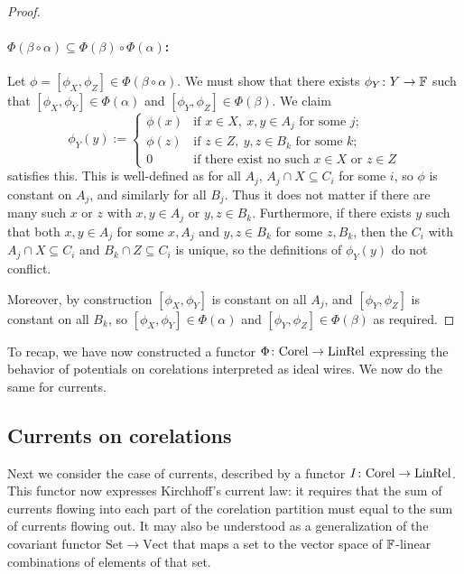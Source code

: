 \begin{proof}
  \paragraph{$\Phi(\beta\circ\alpha) \subseteq \Phi(\beta) \circ \Phi(\alpha)$:}
  Let $\phi = [\phi_X,\phi_Z] \in \Phi(\beta\circ\alpha)$. We must show that there
  exists $\phi_Y{\colon} Y \to {\mathbb F}$ such that $[\phi_X,\phi_Y] \in \Phi(\alpha)$ and
  $[\phi_Y,\phi_Z] \in \Phi(\beta)$. We claim
  \[
    \phi_Y(y):= \begin{cases}
      \phi(x) & \mbox{if } x \in X, \: x,y \in A_j \mbox{ for some }j;\\
      \phi(z) & \mbox{if } z \in Z, \: y,z \in B_k \mbox{ for some }k;\\
      0 & \mbox{if there exist no such }x \in X \mbox{ or }z \in Z
    \end{cases}
  \]
  satisfies this. This is well-defined as for all $A_j$, $A_j \cap X \subseteq
  C_i$ for some $i$, so $\phi$ is constant on $A_j$, and similarly for all $B_j$.
  Thus it does not matter if there are many such $x$ or $z$ with $x, y \in A_j$ or
  $y,z \in B_k$.  Furthermore, if there exists $y$ such that both $x,y \in A_j$
  for some $x,A_j$ and $y,z \in B_k$ for some $z,B_k$, then the $C_i$ with $A_j
  \cap X \subseteq C_i$ and $B_k \cap Z \subseteq C_i$ is unique, so the
  definitions of $\phi_Y(y)$ do not conflict.

  Moreover, by construction $[\phi_X,\phi_Y]$ is constant on all $A_j$, and
  $[\phi_Y,\phi_Z]$ is constant on all $B_k$, so $[\phi_X,\phi_Y] \in
  \Phi(\alpha)$ and $[\phi_Y,\phi_Z] \in \Phi(\beta)$ as required.
\end{proof}

To recap, we have now constructed a functor $\Phi{\colon} \mathrm{Corel} \to
\mathrm{LinRel}$ expressing the behavior of potentials on corelations interpreted
as ideal wires. We now do the same for currents.

\subsection{Currents on corelations}

Next we consider the case of currents, described by a functor $I{\colon}
\mathrm{Corel} \to \mathrm{LinRel}$. This functor now expresses Kirchhoff's
current law: it requires that the sum of currents flowing into each part of the
corelation partition must equal to the sum of currents flowing out.  It may also
be understood as a generalization of the covariant functor $\mathrm{Set} \to
\mathrm{Vect}$ that maps a set to the vector space of ${\mathbb F}$-linear combinations
of elements of that set.

